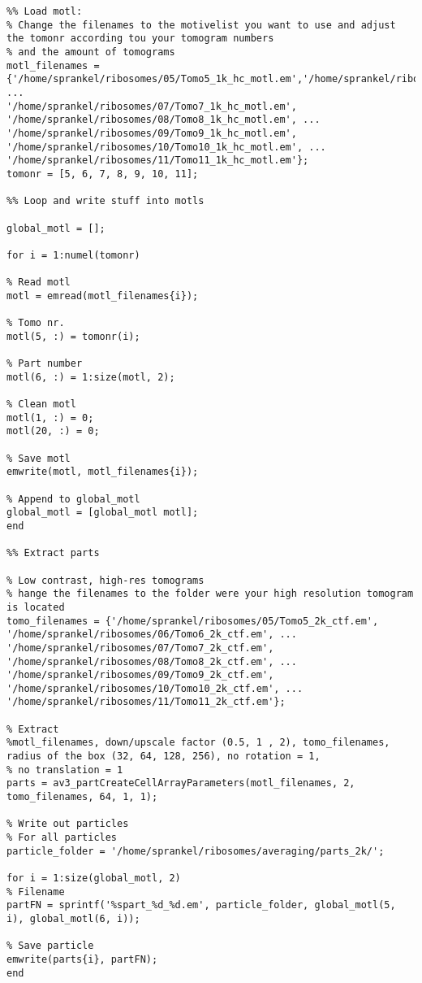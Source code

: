 \documentclass[12pt,a4paper]{scrartcl}
\begin{document}
{\begin{lstlisting}
%% Load motl: 
% Change the filenames to the motivelist you want to use and adjust the tomonr according tou your tomogram numbers 
% and the amount of tomograms
motl_filenames = {'/home/sprankel/ribosomes/05/Tomo5_1k_hc_motl.em','/home/sprankel/ribosomes/06/Tomo6_1k_hc_motl.em', ...
'/home/sprankel/ribosomes/07/Tomo7_1k_hc_motl.em', '/home/sprankel/ribosomes/08/Tomo8_1k_hc_motl.em', ...
'/home/sprankel/ribosomes/09/Tomo9_1k_hc_motl.em', '/home/sprankel/ribosomes/10/Tomo10_1k_hc_motl.em', ...
'/home/sprankel/ribosomes/11/Tomo11_1k_hc_motl.em'};
tomonr = [5, 6, 7, 8, 9, 10, 11];

%% Loop and write stuff into motls

global_motl = [];

for i = 1:numel(tomonr)

% Read motl
motl = emread(motl_filenames{i});

% Tomo nr.
motl(5, :) = tomonr(i);

% Part number
motl(6, :) = 1:size(motl, 2);

% Clean motl
motl(1, :) = 0;
motl(20, :) = 0;

% Save motl
emwrite(motl, motl_filenames{i});

% Append to global_motl
global_motl = [global_motl motl];
end

%% Extract parts

% Low contrast, high-res tomograms
% hange the filenames to the folder were your high resolution tomogram is located
tomo_filenames = {'/home/sprankel/ribosomes/05/Tomo5_2k_ctf.em', '/home/sprankel/ribosomes/06/Tomo6_2k_ctf.em', ...
'/home/sprankel/ribosomes/07/Tomo7_2k_ctf.em', '/home/sprankel/ribosomes/08/Tomo8_2k_ctf.em', ...
'/home/sprankel/ribosomes/09/Tomo9_2k_ctf.em', '/home/sprankel/ribosomes/10/Tomo10_2k_ctf.em', ...
'/home/sprankel/ribosomes/11/Tomo11_2k_ctf.em'};

% Extract
%motl_filenames, down/upscale factor (0.5, 1 , 2), tomo_filenames, radius of the box (32, 64, 128, 256), no rotation = 1,
% no translation = 1 
parts = av3_partCreateCellArrayParameters(motl_filenames, 2, tomo_filenames, 64, 1, 1);

% Write out particles
% For all particles
particle_folder = '/home/sprankel/ribosomes/averaging/parts_2k/';

for i = 1:size(global_motl, 2)
% Filename 
partFN = sprintf('%spart_%d_%d.em', particle_folder, global_motl(5, i), global_motl(6, i));

% Save particle
emwrite(parts{i}, partFN);
end


\end{lstlisting}}
\end{document}
